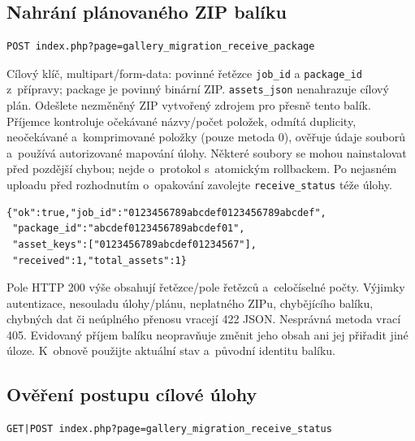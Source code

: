 \documentclass[11pt,a4paper]{article}
\newcommand{\codeword}[1]{\nolinkurl{#1}}
\begin{document}
\subsection{\texorpdfstring{Nahrání plánovaného ZIP balíku}{Nahrání plánovaného ZIP balíku}}

\label{api352:migration-receive-package}

\begin{lstlisting}[language={}]
POST index.php?page=gallery_migration_receive_package
\end{lstlisting}

Cílový klíč, multipart/form-data: povinné řetězce \codeword{job_id} a \codeword{package_id}
z~přípravy; package je povinný binární ZIP. \codeword{assets_json} nenahrazuje cílový plán.
Odešlete nezměněný ZIP vytvořený zdrojem pro přesně tento balík. Příjemce kontroluje
očekávané názvy/počet položek, odmítá duplicity, neočekávané a~komprimované položky (pouze
metoda 0), ověřuje údaje souborů a~používá autorizované mapování úlohy. Některé soubory se
mohou nainstalovat před pozdější chybou; nejde o~protokol s~atomickým rollbackem. Po
nejasném uploadu před rozhodnutím o~opakování zavolejte \codeword{receive_status} téže
úlohy.

\begin{lstlisting}[language={}]
{"ok":true,"job_id":"0123456789abcdef0123456789abcdef",
 "package_id":"abcdef0123456789abcdef01",
 "asset_keys":["0123456789abcdef01234567"],
 "received":1,"total_assets":1}
\end{lstlisting}

Pole HTTP 200 výše obsahují řetězce/pole řetězců a~celočíselné počty. Výjimky autentizace,
nesouladu úlohy/plánu, neplatného ZIPu, chybějícího balíku, chybných dat či neúplného
přenosu vracejí 422 JSON. Nesprávná metoda vrací 405. Evidovaný příjem balíku neopravňuje
změnit jeho obsah ani jej přiřadit jiné úloze. K~obnově použijte aktuální stav a~původní
identitu balíku.

\subsection{\texorpdfstring{Ověření postupu cílové úlohy}{Ověření postupu cílové úlohy}}

\label{api352:migration-receive-status}

\begin{lstlisting}[language={}]
GET|POST index.php?page=gallery_migration_receive_status
\end{lstlisting}
\end{document}
